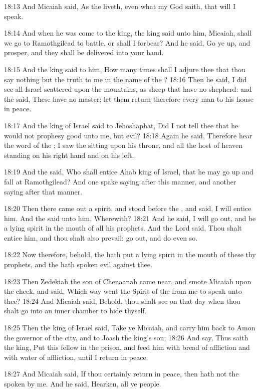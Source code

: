 18:13 And Micaiah said, As the \LORD liveth, even what my God saith, that will I speak.

18:14 And when he was come to the king, the king said unto him, Micaiah, shall we go to Ramothgilead to battle, or shall I forbear?  And he said, Go ye up, and prosper, and they shall be delivered into your hand.

18:15 And the king said to him, How many times shall I adjure thee that thou say nothing but the truth to me in the name of the \LORD?  18:16 Then he said, I did see all Israel scattered upon the mountains, as sheep that have no shepherd: and the \LORD said, These have no master; let them return therefore every man to his house in peace.

18:17 And the king of Israel said to Jehoshaphat, Did I not tell thee that he would not prophesy good unto me, but evil?  18:18 Again he said, Therefore hear the word of the \LORD; I saw the \LORD sitting upon his throne, and all the host of heaven standing on his right hand and on his left.

18:19 And the \LORD said, Who shall entice Ahab king of Israel, that he may go up and fall at Ramothgilead? And one spake saying after this manner, and another saying after that manner.

18:20 Then there came out a spirit, and stood before the \LORD, and said, I will entice him. And the \LORD said unto him, Wherewith?  18:21 And he said, I will go out, and be a lying spirit in the mouth of all his prophets. And the Lord said, Thou shalt entice him, and thou shalt also prevail: go out, and do even so.

18:22 Now therefore, behold, the \LORD hath put a lying spirit in the mouth of these thy prophets, and the \LORD hath spoken evil against thee.

18:23 Then Zedekiah the son of Chenaanah came near, and smote Micaiah upon the cheek, and said, Which way went the Spirit of the \LORD from me to speak unto thee?  18:24 And Micaiah said, Behold, thou shalt see on that day when thou shalt go into an inner chamber to hide thyself.

18:25 Then the king of Israel said, Take ye Micaiah, and carry him back to Amon the governor of the city, and to Joash the king's son; 18:26 And say, Thus saith the king, Put this fellow in the prison, and feed him with bread of affliction and with water of affliction, until I return in peace.

18:27 And Micaiah said, If thou certainly return in peace, then hath not the \LORD spoken by me. And he said, Hearken, all ye people.

